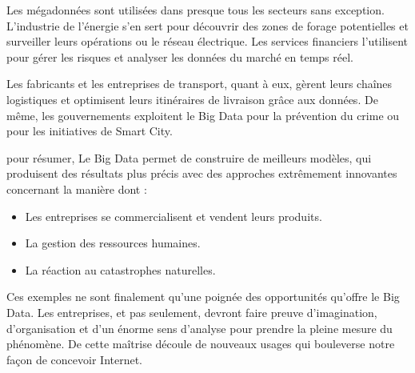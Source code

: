 Les mégadonnées sont utilisées dans presque tous les secteurs sans exception. L'industrie de l'énergie s'en sert pour découvrir des zones de forage potentielles et surveiller leurs opérations ou le réseau électrique. Les services financiers l'utilisent pour gérer les risques et analyser les données du marché en temps réel.

Les fabricants et les entreprises de transport, quant à eux, gèrent leurs chaînes logistiques et optimisent leurs itinéraires de livraison grâce aux données. De même, les gouvernements exploitent le Big Data pour la prévention du crime ou pour les initiatives de Smart City. \cite{DataScientest}

pour résumer, Le Big Data permet de construire de meilleurs modèles, qui produisent
des résultats plus précis avec des approches extrêmement innovantes concernant
la manière dont :

\begin{itemize}[label=\textbullet]
	\item Les entreprises se commercialisent et vendent leurs produits.
	\item La gestion des ressources humaines.
	\item La réaction au catastrophes naturelles.
\end{itemize}

Ces exemples ne sont finalement qu'une poignée des opportunités qu'offre le Big Data. Les entreprises, et pas seulement, devront faire preuve d'imagination, d'organisation et d'un énorme sens d'analyse pour prendre la pleine mesure du phénomène. De cette maîtrise découle de nouveaux usages qui bouleverse notre façon de concevoir
Internet.


